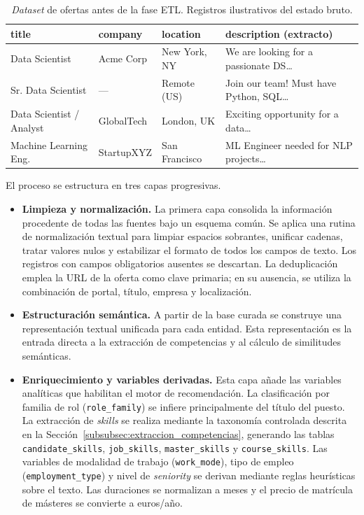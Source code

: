 \begin{table}[H]
  \caption{\textit{Dataset} de ofertas antes de la fase ETL. Registros ilustrativos del estado bruto.}
  \label{tab:tabla3_1}
  \centering
  \footnotesize
  \begin{tabular}{|p{3.2cm}|p{2.8cm}|p{2.0cm}|p{5.5cm}|}
    \hline
    \rowcolor{gray!15}
    \textbf{title} & \textbf{company} & \textbf{location} & \textbf{description (extracto)} \\
    \hline
    Data Scientist & Acme Corp & New York, NY & We are looking for a passionate DS\ldots \\
    Sr. Data Scientist & --- & Remote (US) & Join our team! Must have Python, SQL\ldots \\
    Data Scientist / Analyst & GlobalTech & London, UK & Exciting opportunity for a data\ldots \\
    Machine Learning Eng. & StartupXYZ & San Francisco & ML Engineer needed for NLP projects\ldots \\
    \hline
  \end{tabular}
\end{table}

El proceso se estructura en tres capas progresivas.

\begin{itemize}
  \item \textbf{Limpieza y normalización.} La primera capa consolida la información procedente de todas las fuentes bajo un esquema común. Se aplica una rutina de normalización textual para limpiar espacios sobrantes, unificar cadenas, tratar valores nulos y estabilizar el formato de todos los campos de texto. Los registros con campos obligatorios ausentes se descartan. La deduplicación emplea la URL de la oferta como clave primaria; en su ausencia, se utiliza la combinación de portal, título, empresa y localización.
  \item \textbf{Estructuración semántica.} A partir de la base curada se construye una representación textual unificada para cada entidad. Esta representación es la entrada directa a la extracción de competencias y al cálculo de similitudes semánticas.
  \item \textbf{Enriquecimiento y variables derivadas.} Esta capa añade las variables analíticas que habilitan el motor de recomendación. La clasificación por familia de rol (\texttt{role\_family}) se infiere principalmente del título del puesto. La extracción de \textit{skills} se realiza mediante la taxonomía controlada descrita en la Sección~\ref{subsubsec:extraccion_competencias}, generando las tablas \texttt{candidate\_skills}, \texttt{job\_skills}, \texttt{master\_skills} y \texttt{course\_skills}. Las variables de modalidad de trabajo (\texttt{work\_mode}), tipo de empleo (\texttt{employment\_type}) y nivel de \textit{seniority} se derivan mediante reglas heurísticas sobre el texto. Las duraciones se normalizan a meses y el precio de matrícula de másteres se convierte a euros/año.
\end{itemize}

